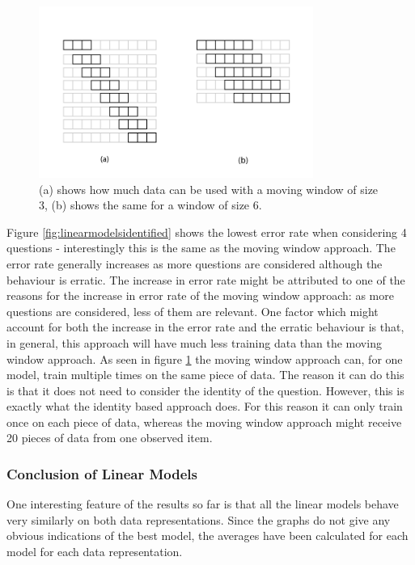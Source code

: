 \begin{figure}[b!]
\centering
\includegraphics[width=0.8\textwidth]{images/movingwindowdata.png}
\caption{(a) shows how much data can be used with a moving window of size 3, (b) shows the same for a window of size 6.}
\label{fig:movingwindowdata}
\end{figure}

Figure \ref{fig:linearmodelsidentified} shows the lowest error rate when considering 4 questions - interestingly this is the same as the moving window approach. The error rate generally increases as more questions are considered although the behaviour is erratic.
The increase in error rate might be attributed to one of the reasons for the increase in error rate of the moving window approach: as more questions are considered, less of them are relevant.
One factor which might account for both the increase in the error rate and the erratic behaviour is that, in general, this approach will have much less training data than the moving window approach.
As seen in figure \ref{fig:movingwindowdata} the moving window approach can, for one model, train multiple times on the same piece of data. The reason it can do this is that it does not need to consider the identity of the question. However, this is exactly what the identity based approach does. For this reason it can only train once on each piece of data, whereas the moving window approach might receive 20 pieces of data from one observed item.

\subsubsection{Conclusion of Linear Models}
One interesting feature of the results so far is that all the linear models behave very similarly on both data representations. Since the graphs do not give any obvious indications of the best model, the averages have been calculated for each model for each data representation.

